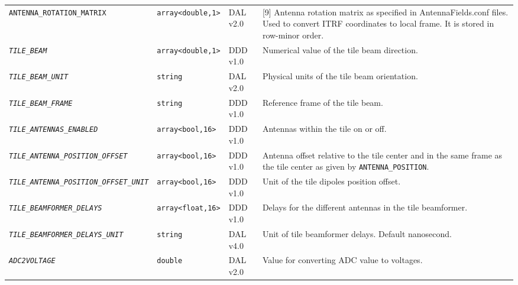\documentclass[a4paper,10pt,bibtotoc]{scrartcl}
\begin{document}
\begin{center}
\begin{supertabular}{|lllp{4.25cm}|}
    \small {\texttt{ANTENNA\_ROTATION\_MATRIX}} & \verb|array<double,1>| & DAL v2.0 & [9] Antenna rotation matrix as specified in AntennaFields.conf files. Used to convert ITRF coordinates to local frame. It is stored in row-minor order.\\
    \small \textit{\texttt{TILE\_BEAM}} & \verb|array<double,1>| & DDD v1.0 & Numerical value of the tile beam direction. \\
    \small \textit{\texttt{TILE\_BEAM\_UNIT}} & \verb|string| & DAL v2.0 & Physical units of the tile beam orientation. \\
    \small \textit{\texttt{TILE\_BEAM\_FRAME}} & \texttt{string} & DDD v1.0 & Reference frame of the tile beam.  \\
    \small \textit{\texttt{TILE\_ANTENNAS\_ENABLED}} & \texttt{array<bool,16>} & DDD v1.0 & Antennas within the tile on or off.  \\
    \small \textit{\texttt{TILE\_ANTENNA\_POSITION\_OFFSET}} & \texttt{array<bool,16>} & DDD v1.0 & Antenna offset relative  to the tile center and in the same frame as the tile center as given by \texttt{ANTENNA\_POSITION}.  \\
    \small \textit{\texttt{TILE\_ANTENNA\_POSITION\_OFFSET\_UNIT}} & \texttt{array<bool,16>} & DDD v1.0 & Unit of the tile dipoles position offset.  \\
    \small \textit{\texttt{TILE\_BEAMFORMER\_DELAYS}} & \texttt{array<float,16>} & DDD v1.0 & Delays for the different antennas in the tile beamformer.   \\
    \small \textit{\texttt{TILE\_BEAMFORMER\_DELAYS\_UNIT}} & \texttt{string} & DAL v4.0 & Unit of tile beamformer delays. Default nanosecond.  \\
    \small \textit{\texttt{ADC2VOLTAGE}} & \verb|double| & DAL v2.0 & Value for converting ADC value to voltages. \\
    \hline
  \end{supertabular}
  \label{tab:antenna table}
\end{center}

\end{document}
